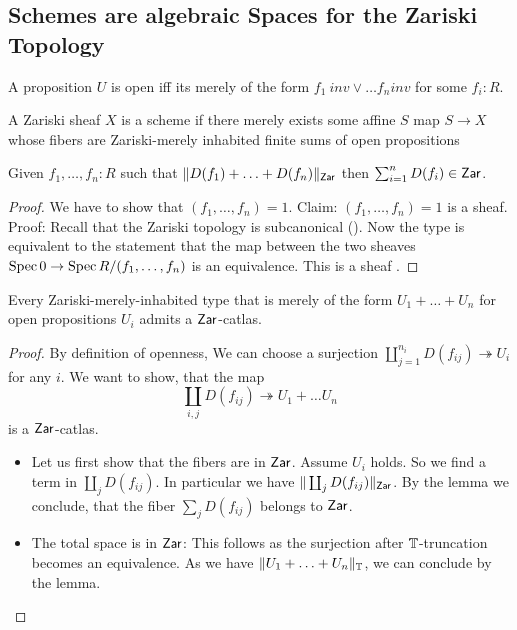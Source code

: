 \subsection{Schemes are algebraic Spaces for the Zariski Topology}
\begin{definition}
 A proposition $U$ is open iff its merely of the form $f_1 \ inv \lor \hdots f_n inv$ for some $f_i : R$.
\end{definition}
\begin{definition}
	A Zariski sheaf $X$ is a scheme if there merely exists some affine $S$  map $S \to X$ whose fibers are Zariski-merely inhabited finite sums of open propositions 
\end{definition}
\begin{lemma}
	Given $f_1, \hdots,f_n : R$ such that $\| D(f_1) + \hdots + D(f_n) \|_{\mathsf{Zar}}$ then $\sum_{i=1}^n D(f_i) \in \mathsf{Zar}$.
\end{lemma}
\begin{proof}
	We have to show that $(f_1,\hdots,f_n) = 1$. 
	Claim: 	$(f_1,\hdots,f_n) = 1$ is a sheaf.
	Proof: 
	Recall that the Zariski topology is subcanonical (\todocite). Now the type is equivalent to the statement that the map between the two sheaves $\operatorname{Spec} 0 \to \operatorname{Spec} R/(f_1,\hdots,f_n)$ is an equivalence. This is a sheaf \todocite.
\end{proof}
\begin{prop}
	Every Zariski-merely-inhabited type that is merely of the form $U_1 + \hdots + U_n$ for open propositions $U_i$ admits a $\mathsf{Zar}$-catlas.
\end{prop}
\begin{proof}
	By definition of openness, We can choose a surjection $\coprod_{j=1}^{n_i} D(f_{ij}) \twoheadrightarrow U_i$ for any $i$. We want to show, that the map
	\[
	\coprod_{i , j} D(f_{ij}) \twoheadrightarrow U_1 + \hdots U_n
	\]
	is a $\mathsf{Zar}$-catlas. 
	\begin{itemize}
		\item Let us first show that the fibers are in $\mathsf{Zar}$. Assume $U_i$ holds. So we find a term in $\coprod_j D(f_{ij})$. In particular we have $\| \coprod_j D(f_{ij})\|_{\mathsf{Zar}}$. By the lemma we conclude, that the fiber $\sum_j D(f_{ij})$ belongs to $\mathsf{Zar}$.\\
		\item The total space is in $\mathsf{Zar}$: This follows as the surjection after $\mathbb{T}$-truncation becomes an equivalence. As we have $\| U_1 + \hdots + U_n\|_{\mathbb{T}}$, we can conclude by the lemma.
	\end{itemize}
	
\end{proof}
